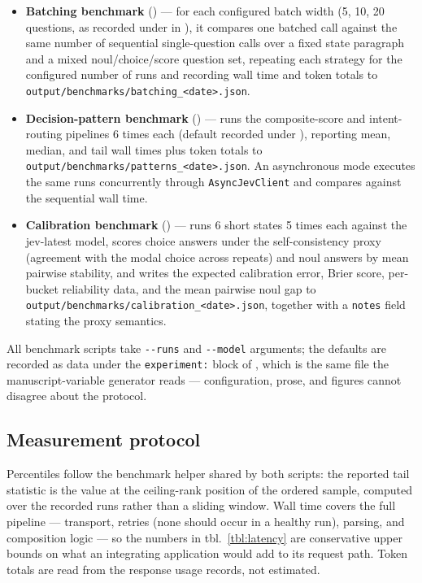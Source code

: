 \documentclass[
  english,
]{article}
\newcounter{none} %
\providecommand{\tightlist}{%
  \setlength{\itemsep}{0pt}\setlength{\parskip}{0pt}}
\begin{document}
\begin{itemize}
\tightlist
\item
  \textbf{Batching benchmark} ()
  --- for each configured batch width (5, 10, 20 questions, as recorded
  under  in
  ), it compares one batched call against
  the same number of sequential single-question calls over a fixed state
  paragraph and a mixed noul/choice/score question set, repeating each
  strategy for the configured number of runs and recording wall time and
  token totals to
  \texttt{output/benchmarks/batching\_\textless{}date\textgreater{}.json}.
\item
  \textbf{Decision-pattern benchmark}
  () --- runs the composite-score
  and intent-routing pipelines 6 times each (default recorded under
  ), reporting mean, median, and tail
  wall times plus token totals to
  \texttt{output/benchmarks/patterns\_\textless{}date\textgreater{}.json}.
  An asynchronous mode executes the same runs concurrently through
  \texttt{AsyncJevClient} and compares against the sequential wall time.
\item
  \textbf{Calibration benchmark}
  () --- runs 6 short states 5
  times each against the jev-latest model, scores choice answers under
  the self-consistency proxy (agreement with the modal choice across
  repeats) and noul answers by mean pairwise stability, and writes the
  expected calibration error, Brier score, per-bucket reliability data,
  and the mean pairwise noul gap to
  \texttt{output/benchmarks/calibration\_\textless{}date\textgreater{}.json},
  together with a \texttt{notes} field stating the proxy semantics.
\end{itemize}

All benchmark scripts take \texttt{-\/-runs} and \texttt{-\/-model}
arguments; the defaults are recorded as data under the
\texttt{experiment:} block of , which is
the same file the manuscript-variable generator reads --- configuration,
prose, and figures cannot disagree about the protocol.

\subsection{Measurement protocol}\label{measurement-protocol}

Percentiles follow the benchmark helper shared by both scripts: the
reported tail statistic is the value at the ceiling-rank position of the
ordered sample, computed over the recorded runs rather than a sliding
window. Wall time covers the full pipeline --- transport, retries (none
should occur in a healthy run), parsing, and composition logic --- so
the numbers in tbl.~\ref{tbl:latency} are conservative upper bounds on
what an integrating application would add to its request path. Token
totals are read from the response usage records, not estimated.
\end{document}
